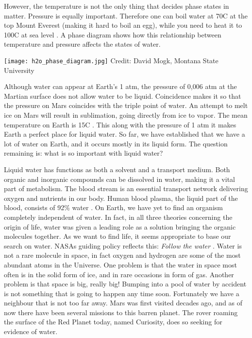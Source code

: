 However, the temperature is not the only thing that decides phase states in matter.
Pressure is equally important.
Therefore one can boil water at 70\degree C at the top Mount Everest (making it hard to boil an egg), while you need to heat it to 100\degree C at sea level \cite{WaterEverest}.
A phase diagram shows how this relationship between temperature and pressure affects the states of water.

\begin{center}
	\texttt{[image: h2o\_phase\_diagram.jpg]}
	\tiny{Credit: David Mogk, Montana State University}
\end{center}

Although water can appear at Earth's 1 atm, the pressure of 0,006 atm at the Martian surface \cite{AtmMars} does not allow water to be liquid.
Coincidence makes it so that the pressure on Mars coincides with the triple point of water.
An attempt to melt ice on Mars will result in sublimation, going directly from ice to vapor.
The mean temperature on Earth is 15\degree C \cite{WikiEarth}.
This along with the pressure of 1 atm it makes Earth a perfect place for liquid water. 
So far, we have established that we have a lot of water on Earth, and it occurs mostly in its liquid form.
The question remaining is: what is so important with liquid water?

Liquid water has functions as both a solvent and a transport medium.
Both organic and inorganic compounds can be dissolved in water, making it a vital part of metabolism.
The blood stream is an essential transport network delivering oxygen and nutrients in our body.
Human blood plasma, the liquid part of the blood, consists of 92\% water \cite{Blood}.
On Earth, we have yet to find an organism completely independent of water. 
In fact, in all three theories concerning the origin of life, water was given a leading role as a solution bringing the organic molecules together.
As we want to find life, it seems appropriate to base our search on water.
NASAs guiding policy reflects this: \textit{Follow the water} \cite{NASAwater}. 
Water is not a rare molecule in space, in fact oxygen and hydrogen are some of the most abundant atoms in the Universe.
One problem is that the water in space most often is in the solid form of ice, and in rare occasions in form of gas.
Another problem is that space is big, really big!
Bumping into a pool of water by accident is not something that is going to happen any time soon.
Fortunately we have a neighbour that is not too far away.
Mars was first visited decades ago, and as of now there have been several missions to this barren planet.
The rover roaming the surface of the Red Planet today, named Curiosity, does so seeking for evidence of water.